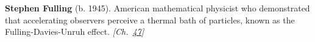 \textbf{Stephen Fulling} (b. 1945). American mathematical physicist who demonstrated that accelerating observers perceive a thermal bath of particles, known as the Fulling-Davies-Unruh effect. \emph{[Ch.~\hyperref[ch:observervac]{47}]}

